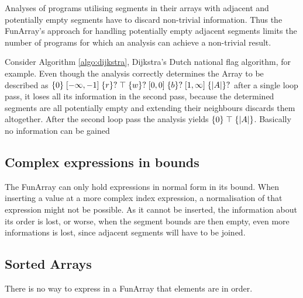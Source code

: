  Analyses of programs utilising segments in their arrays with adjacent and potentially empty segments have to discard non-trivial information. Thus the FunArray's approach for handling potentially empty adjacent segments limits the number of programs for which an analysis can achieve a non-trivial result.
 
 Consider Algorithm \ref{algo:dijkstra}, Dijkstra's Dutch national flag algorithm, for example. Even though the analysis correctly determines the Array to be described as $\{0\} \;[-\infty, -1]\; \{r\}? \;\top\; \{w\}? \;[0, 0]\; \{b\}? \;[1, \infty]\;  \{|A|\}?$ after a single loop pass, it loses all its information in the second pass, because the determined segments are all potentially empty and extending their neighbours discards them altogether. After the second loop pass the analysis yields $\{0\} \;\top\; \{|A|\}$. Basically no information can be gained   
 
\subsection{Complex expressions in bounds}

The FunArray can only hold expressions in normal form in its bound. When inserting a value at a more complex index expression, a normalisation of that expression might not be possible. As it cannot be inserted, the information about its order is lost, or worse, when the segment bounds are then empty, even more informations is lost, since adjacent segments will have to be joined. 

\subsection{Sorted Arrays}

There is no way to express in a FunArray that elements are in order. 
 

